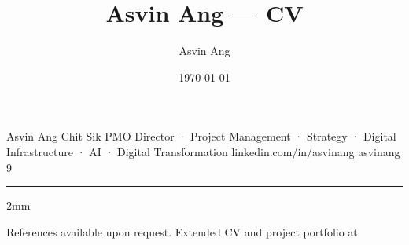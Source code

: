 \documentclass[10pt]{class/Template_CV}
\title{Asvin Ang — CV}
\date{\today}
\author{Asvin Ang}
\begin{document}

  {Asvin Ang Chit Sik}
  {PMO Director · Project Management · Strategy · Digital Infrastructure · AI · Digital Transformation}
  { }
  { }
  {linkedin.com/in/asvinang}
  {asvinang}
  {9}
\par\vspace{2mm}

{}

\medskip
{}

\medskip
\vspace*{1mm}
{\color{Primary2}\hrule}
\vspace*{2mm}
\begin{addmargin}[2mm]{2mm}

\end{addmargin}

\newpage

{}

\medskip
{}

\medskip
{}

\medskip
{\footnotesize\textcolor{Grey1}{\centering References available upon request. Extended CV and project portfolio at \href{https://asvinang.github.io}{}}}

\end{document}
